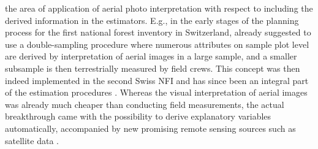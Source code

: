 the area of application of aerial photo interpretation with respect to including the derived information in the estimators. E.g., in the early stages of the planning process for the first national forest inventory in Switzerland, \citet{schmid1970} already suggested to use a double-sampling procedure where numerous attributes on sample plot level are derived by interpretation of aerial images in a large sample, and a smaller subsample is then terrestrially measured by field crews. This concept was then indeed implemented in the second Swiss NFI and has since been an integral part of the estimation procedures \citep{brassel2001}. Whereas the visual interpretation of aerial images was already much cheaper than conducting field measurements, the actual breakthrough came with the possibility to derive explanatory variables automatically, accompanied by new promising remote sensing sources such as satellite data \citep{hildebrandt1987}.\par


